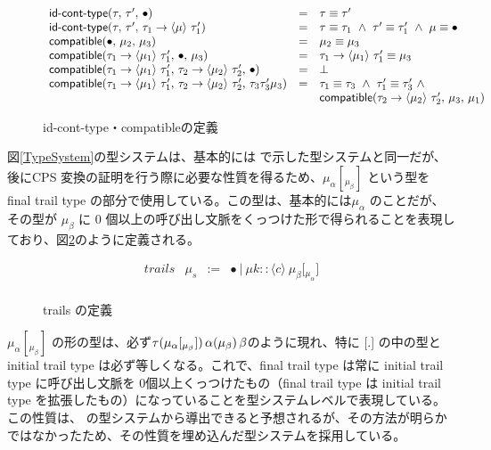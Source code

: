 \documentclass[japanese,draft]{jssst_ppl} %
\begin{document}
\begin{figure}[h]
\[
\begin{array}{lcl}
  \IsIdTrail{\tau}{\tau'}{\Bullet} & = & \tau \equiv \tau' \\
  \IsIdTrail{\tau}{\tau'}{\Trail{\tau_1}{\tau_1'}{\mu}} & = &
   \tau \equiv \tau_1\ \wedge\ \tau' \equiv \tau_1'\ \wedge\ \mu \equiv \Bullet \\

  \Compatible{\Bullet}{\mu_2}{\mu_3}
  & = & \mu_2 \equiv \mu_3\\
\Compatible{\Trail{\tau_1}{\tau_1'}{\mu_1}}{\Bullet}{\mu_3}
  & = & \Trail{\tau_1}{\tau_1'}{\mu_1} \equiv \mu_3\\
\Compatible{\Trail{\tau_1}{\tau_1'}{\mu_1}}
           {\Trail{\tau_2}{\tau_2'}{\mu_2}}{\Bullet}
  & = & \bot \\
\Compatible{\Trail{\tau_1}{\tau_1'}{\mu_1}}
           {\Trail{\tau_2}{\tau_2'}{\mu_2}}
           {{\tau_3}{\tau_3'}{\mu_3}}
  & = & \tau_1 \equiv \tau_3\ \wedge\ \tau_1' \equiv \tau_3'\ \wedge\\ 
  &   & \Compatible{\Trail{\tau_2}{\tau_2'}{\mu_2}}{\mu_3}{\mu_1}
\end{array}
\]
\caption{\textsf{id-cont-type}・\textsf{compatible}の定義}
\label{IsidCompatible}
\end{figure}

図\ref{TypeSystem}の型システムは、基本的には \cite{FSCD2021} で示した型システムと同一だが、後にCPS 変換の証明を行う際に必要な性質を得るため、$\mu_{\alpha}[_{\mu_{\beta}}]$ という型を final trail type の部分で使用している。この型は、基本的には$\mu_{\alpha}$ のことだが、その型が $\mu_{\beta}$ に 0 個以上の呼び出し文脈をくっつけた形で得られることを表現しており、図\ref{TrailsDef}のように定義される。

\begin{figure}[h]
\[
\begin{array}{rrcl}
  trails & \mu_s & := & \bullet\ |\ \mu k :: \langle c \rangle \ \mu_{\beta} \lbrack {_{\mu_{\alpha}}} \rbrack\\
\end{array}
\]
\caption{trails の定義}
\label{TrailsDef}
\end{figure}

$\mu_{\alpha}[_{\mu_{\beta}}]$ の形の型は、必ず$\tau (\mu_{\alpha}\lbrack \tiny{_{\mu_{\beta}}} \rbrack)\,\alpha(\mu_{\beta})\,\beta$のように現れ、特に [.] の中の型と initial trail type は必ず等しくなる。これで、final trail type は常に initial trail type に呼び出し文脈を 0個以上くっつけたもの（final trail type は initial trail type を拡張したもの）になっていることを型システムレベルで表現している。この性質は、\cite{FSCD2021} の型システムから導出できると予想されるが、その方法が明らかではなかったため、その性質を埋め込んだ型システムを採用している。
\end{document}
